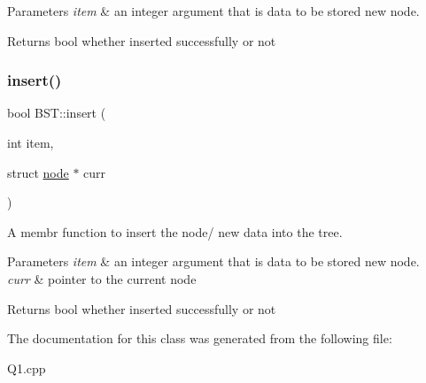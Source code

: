 \begin{DoxyParams}{Parameters}
{\em item} & an integer argument that is data to be stored new node. \\
\hline
\end{DoxyParams}
\begin{DoxyReturn}{Returns}
bool whether inserted successfully or not 
\end{DoxyReturn}
\mbox{\label{classBST_ac6e2b74e41a615fa4ccc1b7de4981559}} 
\subsubsection{\texorpdfstring{insert()}{insert()}\hspace{0.1cm}{\footnotesize\ttfamily [2/2]}}
{\footnotesize\ttfamily bool B\+S\+T\+::insert (\begin{DoxyParamCaption}\item[{int}]{item,  }\item[{struct \hyperlink{structnode}{node} $\ast$}]{curr }\end{DoxyParamCaption})\hspace{0.3cm}{\ttfamily [protected]}}



A membr function to insert the node/ new data into the tree. 


\begin{DoxyParams}{Parameters}
{\em item} & an integer argument that is data to be stored new node. \\
\hline
{\em curr} & pointer to the current node \\
\hline
\end{DoxyParams}
\begin{DoxyReturn}{Returns}
bool whether inserted successfully or not 
\end{DoxyReturn}


The documentation for this class was generated from the following file\+:\begin{DoxyCompactItemize}
\item 
Q1.\+cpp\end{DoxyCompactItemize}
